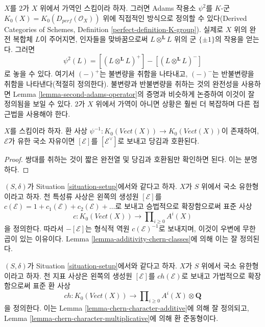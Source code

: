 \begin{remark}
\label{remark-adams-derived}
$X$를 $2$가 $X$ 위에서 가역인 스킴이라 하자. 그러면 Adams 작용소 $\psi^2$를
$K$-군 $K_0(X) = K_0(D_{perf}(\mathcal{O}_X))$ 위에 직접적인 방식으로
정의할 수 있다(Derived Categories of Schemes, Definition
\ref{perfect-definition-K-group}). 실제로 $X$ 위의 완전 복합체 $L$이
주어지면, 인자들을 맞바꿈으로써 $L \otimes^\mathbf{L} L$ 위의 군
$\{\pm 1\}$의 작용을 얻는다. 그러면
$$
\psi^2(L) = [(L \otimes^\mathbf{L} L)^+] -
[(L \otimes^\mathbf{L} L)^-]
$$
로 놓을 수 있다. 여기서 $(-)^+$는 불변량을 취함을 나타내고,
$(-)^-$는 반불변량을 취함을 나타낸다(적절히 정의한다). 불변량과
반불변량을 취하는 것의 완전성을 사용하면 Lemma
\ref{lemma-second-adams-operator}의 증명과 비슷하게 논증하여 이것이
잘 정의됨을 보일 수 있다. $2$가 $X$ 위에서 가역이 아니면 상황은
훨씬 더 복잡하며 다른 접근법을 사용해야 한다.
\end{remark}

\begin{lemma}
\label{lemma-minus-adams-operator}
$X$를 스킴이라 하자. 환 사상
$\psi^{-1} : K_0(\textit{Vect}(X)) \to K_0(\textit{Vect}(X))$이 존재하여,
$\mathcal{E}$가 유한 국소 자유이면 $[\mathcal{E}]$를
$[\mathcal{E}^\vee]$로 보내고 당김과 호환된다.
\end{lemma}

\begin{proof}
쌍대를 취하는 것이 짧은 완전열 및 당김과 호환됨만 확인하면 된다.
이는 분명하다.
\end{proof}

\begin{remark}
\label{remark-chern-classes-K}
$(S, \delta)$가 Situation \ref{situation-setup}에서와 같다고 하자.
$X$가 $S$ 위에서 국소 유한형이라고 하자. 천 특성류 사상은 왼쪽의
생성원 $[\mathcal{E}]$를
$c(\mathcal{E}) = 1 + c_1(\mathcal{E}) + c_2(\mathcal{E}) + \ldots$로
보내고 승법적으로 확장함으로써 표준 사상
$$
c : K_0(\textit{Vect}(X)) \longrightarrow \prod\nolimits_{i \geq 0} A^i(X)
$$
을 정의한다. 따라서 $-[\mathcal{E}]$는 형식적 역원
$c(\mathcal{E})^{-1}$로 보내지며, 이것이 우변에 무한곱이 있는
이유이다. Lemma \ref{lemma-additivity-chern-classes}에 의해 이는 잘
정의된다.
\end{remark}

\begin{remark}
\label{remark-chern-character-K}
$(S, \delta)$가 Situation \ref{situation-setup}에서와 같다고 하자.
$X$가 $S$ 위에서 국소 유한형이라고 하자. 천 지표 사상은 왼쪽의
생성원 $[\mathcal{E}]$를 $ch(\mathcal{E})$로 보내고 가법적으로
확장함으로써 표준 환 사상
$$
ch : K_0(\textit{Vect}(X)) \longrightarrow
\prod\nolimits_{i \geq 0} A^i(X) \otimes \mathbf{Q}
$$
을 정의한다. 이는 Lemma \ref{lemma-chern-character-additive}에 의해
잘 정의되고, Lemma \ref{lemma-chern-character-multiplicative}에 의해
환 준동형이다.
\end{remark}

